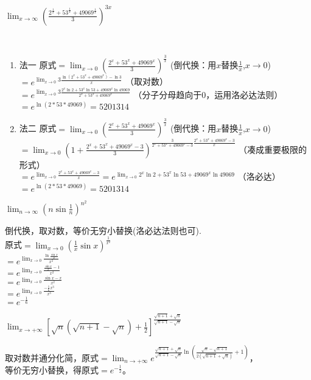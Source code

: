 \begin{example}
	$\lim_{x \to \infty}(\frac{2^{\frac{1}{x}}+53^{\frac{1}{x}}+49069^{\frac{1}{x}}}{3})^{3x}$
\end{example}\
\begin{solution}
	\begin{enumerate}
		\item 法一
		      原式$=\lim_{x \to 0}(\frac{2^{x}+53^{x}+49069^{x}}{3})^{\frac{3}{x}}$ (倒代换：用$x$替换$\frac{1}{x}$,$x \to 0$)  \\ $=e^{\lim_{x \to 0}3 \frac{\ln(2^x+53^x+49069^x)-\ln 3}{x}}$ （取对数）\\$=e^{\lim_{x \to 0}3 \frac{2^x\ln2+53^x\ln 53+49069^x\ln 49069}{2^x+53^x+49069^x}}$ （分子分母趋向于0，运用洛必达法则）\\
		      $=e^{\ln (2*53*49069)}=5201314$

		\item 法二
		      原式$=\lim_{x \to 0}(\frac{2^{x}+53^{x}+49069^{x}}{3})^{\frac{3}{x}}$ (倒代换：用$x$替换$\frac{1}{x}$,$x \to 0$)\\
		      $=\lim_{x \to 0}(1+\frac{2^x+53^x+49069^x-3}{3})^{\frac{3}{2^x+53^x+49069^x-3}\frac{2^x+53^x+49069^x-3}{x}}$ （凑成重要极限的形式）\\
		      $=e^{\lim_{x \to 0}\frac{2^x+53^x+49069^x-3}{x}}=e^{\lim_{x \to 0}2^x\ln2+53^x\ln 53+49069^x\ln 49069}$  （洛必达）\\
		      $=e^{\ln (2*53*49069)}=5201314$
	\end{enumerate}
\end{solution}
\begin{example}
	$\lim_{n \to \infty}(n\sin \frac{1}{n})^{n^2}$
	\begin{solution}
		倒代换，取对数，等价无穷小替换(洛必达法则也可).\\
		原式$=\lim_{x \to 0}(\frac{1}{x}\sin x)^{\frac{1}{x^2}}$\\
		$=e^{\lim_{x \to 0}\frac{\ln \frac{\sin x}{x}}{x^2}}$\\
		$=e^{\lim_{x \to 0}\frac{\frac{\sin x}{x}-1}{x^2}}$\\
		$=e^{\lim_{x \to 0}\frac{\sin x-x}{x^2}}$\\
		$=e^{\lim_{x \to 0}\frac{-\frac{1}{6}x^3}{x^3}}$\\$=e^{-\frac{1}{6}}$
	\end{solution}
\end{example}

\begin{example}
	$\lim_{x \to +\infty}[\sqrt{n}(\sqrt{n+1}-\sqrt{n})+\frac{1}{2}]^{\frac{\sqrt{n+1}+\sqrt{n}}{\sqrt{n+1}-\sqrt{n}}}$
	\begin{solution}
		取对数并通分化简，原式$=\lim_{n \to +\infty}e^{\frac{\sqrt{n+1}+\sqrt{n}}{\sqrt{n+1}-\sqrt{n}}\ln (\frac{\sqrt{n}-\sqrt{n+1}}{2(\sqrt{n+1}+\sqrt{n})}+1)}$，\\
		等价无穷小替换，得原式$=e^{-\frac{1}{2}}$。
	\end{solution}
\end{example}

